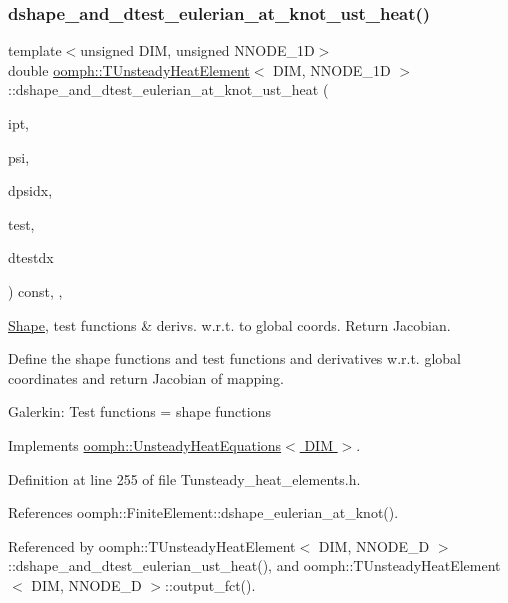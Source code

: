 \subsubsection{\texorpdfstring{dshape\+\_\+and\+\_\+dtest\+\_\+eulerian\+\_\+at\+\_\+knot\+\_\+ust\+\_\+heat()}{dshape\_and\_dtest\_eulerian\_at\_knot\_ust\_heat()}\hspace{0.1cm}{\footnotesize\ttfamily [1/2]}}
{\footnotesize\ttfamily template$<$unsigned D\+IM, unsigned N\+N\+O\+D\+E\+\_\+1D$>$ \\
double \hyperlink{classoomph_1_1TUnsteadyHeatElement}{oomph\+::\+T\+Unsteady\+Heat\+Element}$<$ D\+IM, N\+N\+O\+D\+E\+\_\+1D $>$\+::dshape\+\_\+and\+\_\+dtest\+\_\+eulerian\+\_\+at\+\_\+knot\+\_\+ust\+\_\+heat (\begin{DoxyParamCaption}\item[{const unsigned \&}]{ipt,  }\item[{\hyperlink{classoomph_1_1Shape}{Shape} \&}]{psi,  }\item[{\hyperlink{classoomph_1_1DShape}{D\+Shape} \&}]{dpsidx,  }\item[{\hyperlink{classoomph_1_1Shape}{Shape} \&}]{test,  }\item[{\hyperlink{classoomph_1_1DShape}{D\+Shape} \&}]{dtestdx }\end{DoxyParamCaption}) const\hspace{0.3cm}{\ttfamily [inline]}, {\ttfamily [protected]}, {\ttfamily [virtual]}}



\hyperlink{classoomph_1_1Shape}{Shape}, test functions \& derivs. w.\+r.\+t. to global coords. Return Jacobian. 

Define the shape functions and test functions and derivatives w.\+r.\+t. global coordinates and return Jacobian of mapping.

Galerkin\+: Test functions = shape functions 

Implements \hyperlink{classoomph_1_1UnsteadyHeatEquations_aa6ab5a2e2bbf3830dfb17f8f2d1281b0}{oomph\+::\+Unsteady\+Heat\+Equations$<$ D\+I\+M $>$}.



Definition at line 255 of file Tunsteady\+\_\+heat\+\_\+elements.\+h.



References oomph\+::\+Finite\+Element\+::dshape\+\_\+eulerian\+\_\+at\+\_\+knot().



Referenced by oomph\+::\+T\+Unsteady\+Heat\+Element$<$ D\+I\+M, N\+N\+O\+D\+E\+\_\+D $>$\+::dshape\+\_\+and\+\_\+dtest\+\_\+eulerian\+\_\+ust\+\_\+heat(), and oomph\+::\+T\+Unsteady\+Heat\+Element$<$ D\+I\+M, N\+N\+O\+D\+E\+\_\+D $>$\+::output\+\_\+fct().

